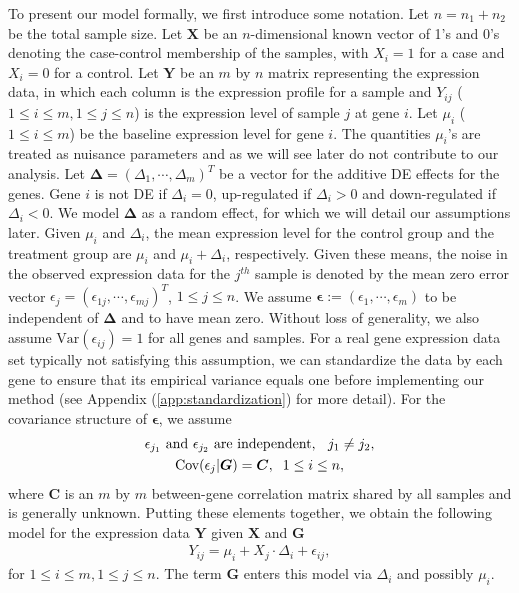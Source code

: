 	To present our model formally, we first introduce some notation. Let $n=n_1+n_2$ be the total
	sample size. Let $\bm X$ be an $n$-dimensional known vector of 1's and 0's denoting the 
	case-control membership of the samples, with $X_i=1$ for a case and $X_i=0$ for a control. Let 
	$\bm Y$ be an $m$ by $n$ matrix representing the expression data, in which each column is the 
	expression profile for a sample and $Y_{ij}$ ($1\le i\le m, 1\le j\le n$) is the expression 
	level of sample $j$ at gene	$i$. Let $\mu_i$ ($1\le i\le m$) be the baseline expression 
	level for gene $i$. The quantities $\mu_i$'s are treated as nuisance parameters and as we will 
	see later do not contribute to our analysis. Let $\bm \Delta=(\Delta_1, \cdots, \Delta_m)^T$ be 
	a vector for the additive DE effects for the genes. Gene $i$ is not DE if $\Delta_i=0$, 
	up-regulated if $\Delta_i >0 $ and down-regulated if $\Delta_i<0$. We model $\bm \Delta$ as a 
	random effect, for which we will detail our assumptions later. Given $\mu_i$ and $\Delta_i$, 
	the mean expression level for the control group and the treatment group are $\mu_i$ and 
	$\mu_i+\Delta_i$, respectively. Given these means, the noise in the observed expression data 
	for the $j^{th}$ sample is denoted by the mean zero error vector 
	$\epsilon_j=(\epsilon_{1j},\cdots,\epsilon_{mj})^T$, $1\le j\le n$. We assume
	$\bm\epsilon:=(\epsilon_1,\cdots,\epsilon_m)$ to be independent of $\bm \Delta$ and to have mean
	zero. Without loss of generality, we also assume $\mbox{Var}(\epsilon_{ij})=1$ for all genes and
	samples. For a real gene expression data set typically not satisfying this assumption, we can
	standardize the data by each gene to ensure that its empirical variance equals one before 
	implementing our method (see Appendix (\ref{app:standardization}) for more detail). For the 
	covariance structure of $\bm \epsilon$, we assume 
	\begin{gather}
	\text{$\epsilon_{j_1}$ and $\epsilon_{j_2}$ are independent, \;\;$j_1\ne
		j_2$},\label{eq:gene_indep}\\
	\mbox{Cov}(\epsilon_j|\bm G)=\bm C, \;\;1\le i\le n,\label{eq:gene_cor}
	\end{gather}
	where $\bm C$ is an $m$ by $m$ between-gene correlation matrix shared by all samples and is
	generally unknown. Putting these elements together, we obtain the following model for the 
	expression data $\bm Y$ given $\bm X$ and $\bm G$ 
	\begin{align}
	\label{eq:Ymodel}
	Y_{ij} = \mu_i + X_j\cdot\Delta_i + \epsilon_{ij},
	\end{align}
	for $1\le i\le m, 1\le j\le n$. The term $\bm G$ enters this model via $\Delta_i$ and possibly 
	$\mu_i$.
	
